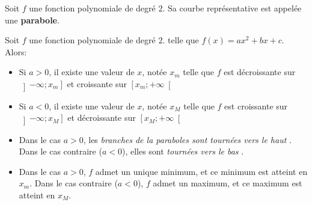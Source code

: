\documentclass{article}
\begin{document}
\vspace*{1cm}
\begin{minipage}{0.45\textwidth}
\begin{center}
\end{center}   
\end{minipage}
\hfill
\begin{minipage}{0.45\textwidth}
\begin{center}
\end{center}    
\end{minipage}
\vspace*{0.5cm}
\begin{tcolorbox}
\begin{definition}
Soit $f$ une fonction polynomiale de degré $2$. Sa courbe représentative est appelée une \textbf{parabole}.
\end{definition}
\end{tcolorbox}
\begin{proposition}
Soit $f$ une fonction polynomiale de degré $2$. telle que $f(x) = ax^2 + bx + c$. Alors:
\begin{itemize}
\item Si $a > 0$, il existe une valeur de $x$, notée $x_m$ telle que $f$ est décroissante sur $\left] - \infty; x_m \right]$ et croissante sur $\left[x_m; + \infty \right[$
\item Si $a < 0$, il existe une valeur de $x$, notée $x_M$ telle que $f$ est croissante sur $\left] - \infty; x_M \right]$ et décroissante sur $\left[x_M; + \infty \right[$
\end{itemize}
\end{proposition}
\begin{remark}
\hfill
\begin{itemize}
\item Dans le cas $a > 0$, les \emph{\og branches de la paraboles sont tournées vers le haut \fg}. Dans le cas contraire ($a < 0$), elles sont \emph{\og tournées vers le bas \fg}.
\item Dans le cas $a > 0$, $f$ admet un unique minimum, et ce minimum est atteint en $x_m$. Dans le cas contraire ($a < 0$), $f$ admet un maximum, et ce maximum est atteint en $x_M$. 
\end{itemize}
\end{remark}
\newpage
\end{document}
